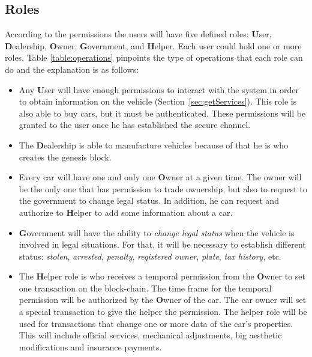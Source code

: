 \subsection{Roles}

According to the permissions the users will have five defined roles: 
\textbf{U}ser,
\textbf{D}ealership,
\textbf{O}wner,
\textbf{G}overnment, and
\textbf{H}elper.
Each user could hold one or more roles.
Table \ref{table:operations} pinpoints the type of operations that each role can do and the explanation
is as follows: 
\begin{itemize}
    \item Any \textbf{U}ser will have enough permissions to interact with the system in order to 
        obtain information on the vehicle (Section~\ref{sec:getServices}). This role is also able 
        to buy cars, but it must be authenticated. 
        These permissions will be granted to the user once he has established the secure channel. 
    \item The \textbf{D}ealership is able to manufacture vehicles because of that he is who creates the 
        genesis block.
    \item Every car will have one and only one \textbf{O}wner at a given time. The owner will be the only one 
        that has permission to trade ownership, but also to request to the government to change legal
        status. In addition, he can request and authorize to \textbf{H}elper to add some information 
        about a car.
    \item \textbf{G}overnment will have the ability to  \textit{change legal status} when the 
        vehicle is involved in legal situations. For that, it will be necessary to establish 
        different status: \textit{stolen}, \textit{arrested}, \textit{penalty}, \textit{registered owner}, \textit{plate}, 
        \textit{tax history}, etc.
    \item The \textbf{H}elper role is who receives a temporal permission from the \textbf{O}wner to set one 
        transaction on the block-chain. The time frame for the temporal permission will be authorized by 
        the \textbf{O}wner of the car. The car owner will set a special transaction to give the helper 
        the permission. The helper role will be used for transactions that change one or more data of the 
        car's properties. This will include official services, mechanical adjustments, big aesthetic 
        modifications and insurance payments.
\end{itemize}







